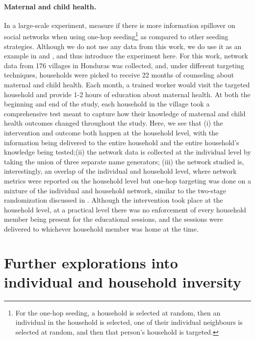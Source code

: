 \paragraph{Maternal and child health.} In a large-scale experiment, \cite{airoldi2024} measure if there is more information spillover on social networks when using one-hop seeding\footnote{For the one-hop seeding, a household is selected at random, then an individual in the household is selected, one of their individual neighbours is selected at random, and then that person's household is targeted.}\citep{cohen2003efficient} as compared to other seeding strategies. Although we do not use any data from this work, we do use it as an example in  and , and thus introduce the experiment here. For this work, network data from 176 villages in Honduras was collected, and, under different targeting techniques, households were picked to receive 22 months of counseling about maternal and child health. Each month, a trained worker would visit the targeted household and provide 1-2 hours of education about maternal health. At both the beginning and end of the study, each household in the village took a comprehensive test meant to capture how their knowledge of maternal and child health outcomes changed throughout the study. Here, we see that (i) the intervention and outcome both happen at the household level, with the information being delivered to the entire household and the entire household's knowledge being tested;(ii) the network data is collected at the individual level by taking the union of three separate name generators; (iii) the network studied is, interestingly, an overlap of the individual and household level, where network metrics were reported on the household level but one-hop targeting was done on a mixture of the individual and household network, similar to the two-stage randomization discussed in \cite{basse2018analyzing}. Although the intervention took place at the household level, at a practical level there was no enforcement of every household member being present for the educational sessions, and the sessions were delivered to whichever household member was home at the time. 

\section{Further explorations into individual and household inversity} \label{apx:inversity}

